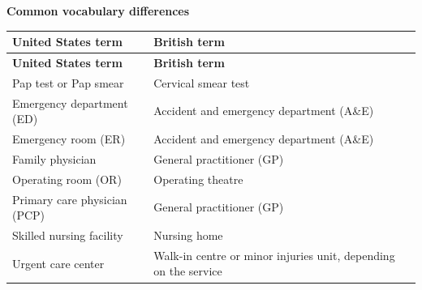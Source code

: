\textbf{Common vocabulary differences}

\begin{longtable}{>{\raggedright\arraybackslash}p{} >{\raggedright\arraybackslash}p{}}
\toprule
\textbf{United States term} & \textbf{British term} \\
\midrule
\endfirsthead
\toprule
\textbf{United States term} & \textbf{British term} \\
\midrule
\endhead
\bottomrule
\endfoot

Pap test or Pap smear & Cervical smear test \\
Emergency department (ED) & Accident and emergency department (A\&E) \\
Emergency room (ER) & Accident and emergency department (A\&E) \\
Family physician & General practitioner (GP) \\
Operating room (OR) & Operating theatre \\
Primary care physician (PCP) & General practitioner (GP) \\
Skilled nursing facility & Nursing home \\
Urgent care center & Walk-in centre or minor injuries unit, depending on the service \\

\end{longtable}
